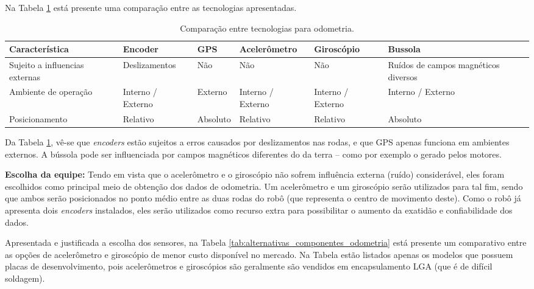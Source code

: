 Na Tabela \ref{tab:alternativas_tecnologias_odometria} está presente uma comparação entre as tecnologias apresentadas. 

\begin{table}[h]
  \caption{Comparação entre tecnologias para odometria.}
  \centering
  \begin{tabular}{p{3cm}|p{2.2cm}p{1.7cm}p{2.2cm}p{2.2cm}p{2.2cm}}
    \toprule
    \textbf{Característica} & \textbf{Encoder} & \textbf{GPS} & \textbf{Acelerômetro} & \textbf{Giroscópio} & \textbf{Bussola} \\
    \hline
    Sujeito a influencias externas & Deslizamentos & Não & Não & Não & Ruídos de campos magnéticos diversos \\
    \hline
    Ambiente de operação & Interno / Externo & Externo & Interno / Externo & Interno / Externo & Interno / Externo \\
    \hline
    Posicionamento & Relativo & Absoluto & Relativo & Relativo & Absoluto \\
    \bottomrule
  \end{tabular}
  \label{tab:alternativas_tecnologias_odometria}
\end{table}

Da Tabela \ref{tab:alternativas_tecnologias_odometria}, vê-se que \textit{encoders} estão sujeitos a erros causados por deslizamentos nas rodas, e que GPS apenas funciona em ambientes externos. A bússola pode ser influenciada por campos magnéticos diferentes do da terra -- como por exemplo o gerado pelos motores. 

\textbf{Escolha da equipe:} Tendo em vista que o acelerômetro e o giroscópio não sofrem influência externa (ruído) considerável, eles foram escolhidos como principal meio de obtenção dos dados de odometria. Um acelerômetro e um giroscópio serão utilizados para tal fim, sendo que ambos serão posicionados no ponto médio entre as duas rodas do robô (que representa o centro de movimento deste). Como o robô já apresenta dois \textit{encoders} instalados, eles serão utilizados como recurso extra para possibilitar o aumento da exatidão e confiabilidade dos dados.

Apresentada e justificada a escolha dos sensores, na Tabela \ref{tab:alternativas_componentes_odometria} está presente um comparativo entre as opções de acelerômetro e giroscópio de menor custo disponível no mercado. Na Tabela estão listados apenas os modelos que possuem placas de desenvolvimento, pois acelerômetros e giroscópios são geralmente são vendidos em encapsulamento LGA (que é de difícil soldagem).


